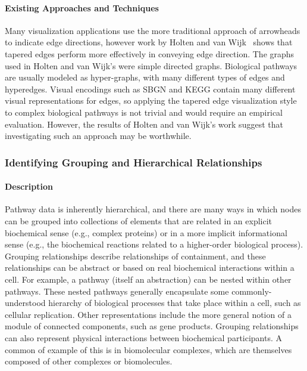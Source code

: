 \documentclass[twocolumn]{bmcart}%
\begin{document}
\paragraph*{Existing Approaches and Techniques}

Many visualization applications use the more traditional approach of arrowheads to indicate edge directions, however work by Holten and van Wijk~\cite{Holten2009} shows that tapered edges perform more effectively in conveying edge direction.
The graphs used in Holten and van Wijk's were simple directed graphs.
Biological pathways are usually modeled as hyper-graphs, with many different types of edges and hyperedges.
Visual encodings such as SBGN and KEGG contain many different visual representations for edges, so applying the tapered edge visualization style to complex biological pathways is not trivial and would require an empirical evaluation.
However, the results of Holten and van Wijk's work suggest that investigating such an approach may be worthwhile.

\subsubsection*{Identifying Grouping and Hierarchical Relationships}

\paragraph*{Description}

Pathway data is inherently hierarchical, and there are many ways in which nodes can be grouped into collections of elements that are related in an explicit biochemical sense (e.g., complex proteins) or in a more implicit informational sense (e.g., the biochemical reactions related to a higher-order biological process).
Grouping relationships describe relationships of containment, and these relationships can be abstract or based on real biochemical interactions within a cell.
For example, a pathway (itself an abstraction) can be nested within other pathways.
These nested pathways generally encapsulate some commonly-understood hierarchy of biological processes that take place within a cell, such as cellular replication.
Other representations include the more general notion of a module of connected components, such as gene products.
Grouping relationships can also represent physical interactions between biochemical participants.
A common of example of this is in biomolecular complexes, which are themselves composed of other complexes or biomolecules.
\end{document}
